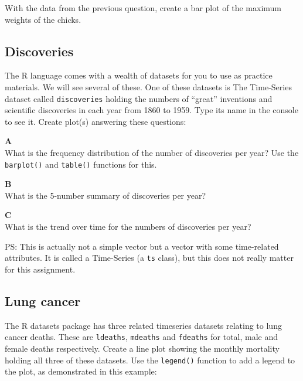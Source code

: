 \documentclass[]{book}
\begin{document}
With the data from the previous question, create a bar plot of the maximum weights of the chicks.

\hypertarget{discoveries}{%
\subsection{Discoveries}\label{discoveries}}

The R language comes with a wealth of datasets for you to use as practice materials. We will see several of these. One of these datasets is The Time-Series dataset called \texttt{discoveries} holding the numbers of ``great'' inventions and scientific discoveries in each year from 1860 to 1959. Type its name in the console to see it. Create plot(s) answering these questions:

\textbf{A}\\
What is the frequency distribution of the number of discoveries per year? Use the \texttt{barplot()} and \texttt{table()} functions for this.

\textbf{B}\\
What is the 5-number summary of discoveries per year?

\textbf{C}\\
What is the trend over time for the numbers of discoveries per year?

PS: This is actually not a simple vector but a vector with some time-related attributes. It is called a Time-Series (a \texttt{ts} class), but this does not really matter for this assignment.

\hypertarget{lung-cancer}{%
\subsection{Lung cancer}\label{lung-cancer}}

The R datasets package has three related timeseries datasets relating to lung cancer deaths. These are \texttt{ldeaths}, \texttt{mdeaths} and \texttt{fdeaths} for total, male and female deaths respectively. Create a line plot showing the monthly mortality holding all three of these datasets. Use the \texttt{legend()} function to add a legend to the plot, as demonstrated in this example:
\end{document}
